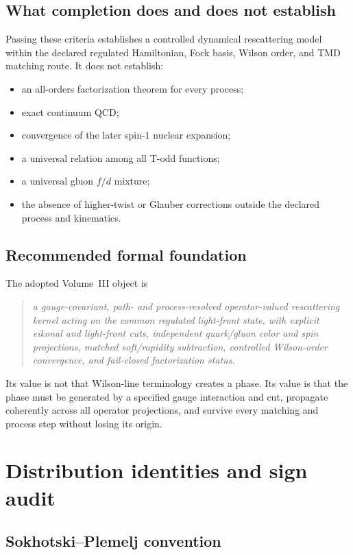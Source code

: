 \documentclass[11pt]{article}
\begin{document}
\subsection{What completion does and does not establish}

Passing these criteria establishes a controlled dynamical rescattering model
within the declared regulated Hamiltonian, Fock basis, Wilson order, and TMD
matching route.  It does not establish:
\begin{itemize}
\item an all-orders factorization theorem for every process;
\item exact continuum QCD;
\item convergence of the later spin-1 nuclear expansion;
\item a universal relation among all T-odd functions;
\item a universal gluon \(f/d\) mixture;
\item the absence of higher-twist or Glauber corrections outside the declared
      process and kinematics.
\end{itemize}

\subsection{Recommended formal foundation}

The adopted Volume~III object is
\begin{quote}
\emph{a gauge-covariant, path- and process-resolved operator-valued
rescattering kernel acting on the common regulated light-front state, with
explicit eikonal and light-front cuts, independent quark/gluon color and spin
projections, matched soft/rapidity subtraction, controlled Wilson-order
convergence, and fail-closed factorization status.}
\end{quote}
Its value is not that Wilson-line terminology creates a phase.  Its value is
that the phase must be generated by a specified gauge interaction and cut,
propagate coherently across all operator projections, and survive every
matching and process step without losing its origin.

\appendix

\section{Distribution identities and sign audit}
\label{app:distributions}

\subsection{Sokhotski--Plemelj convention}
\end{document}

